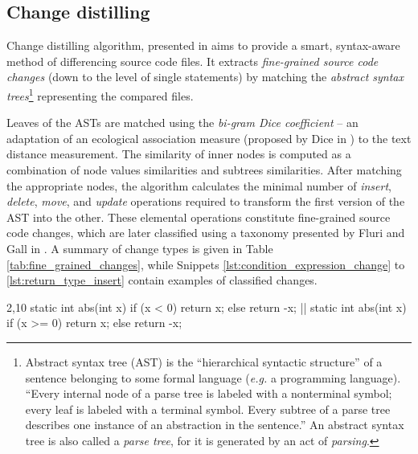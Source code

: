 \documentclass{pracamgr}
\newenvironment{diff}[2]
	{
		\hspace*{-\parindent}
		\begin{minipage}{\textwidth}
		\captionsetup{width=\linewidth}
		\captionof{lstlisting}{#1}
		\label{#2}
	}
	{
		\end{minipage}
	}
\begin{document}
\subsection{Change distilling}
\label{sec:change_distilling}
Change distilling algorithm, presented in \cite{change_distilling} aims to provide a smart, syntax-aware method of differencing source code files. It extracts \emph{fine-grained source code changes} (down to the level of single statements) by matching the \emph{abstract syntax trees}\footnote{Abstract syntax tree (AST) is the ``hierarchical syntactic structure'' of a sentence belonging to some formal language (\textit{e.g.} a programming language). ``Every internal node of a parse tree is labeled with a nonterminal symbol; every leaf is labeled with a terminal symbol. Every subtree of a parse tree describes one instance of an abstraction in the sentence.'' \cite[p. 121]{concepts} An abstract syntax tree is also called a \emph{parse tree}, for it is generated by an act of \emph{parsing}.} representing the compared files.

Leaves of the ASTs are matched using the \emph{bi-gram Dice coefficient} -- an adaptation of an ecological association measure (proposed by Dice in \cite{Dice}) to the text distance measurement. The similarity of inner nodes is computed as a combination of node values similarities and subtrees similarities. After matching the appropriate nodes, the algorithm calculates the minimal number of \emph{insert}, \emph{delete}, \emph{move}, and \emph{update} operations required to transform the first version of the AST into the other. These elemental operations constitute fine-grained source code changes, which are later classified using a taxonomy presented by Fluri and Gall in \cite{classifying}. A summary of change types is given in Table \ref{tab:fine_grained_changes}, while Snippets \ref{lst:condition_expression_change} to \ref{lst:return_type_insert} contain examples of classified changes.

\addtocounter{footnote}{1}
\addtocounter{footnote}{-1}


\begin{diff}{Condition expression change}{lst:condition_expression_change}
\begin{lstdiff}{2,10}
static int abs(int x) {
	if (x < 0) {
		return x;
	} else {
		return -x;
	}
}
|\vfill\columnbreak|
static int abs(int x) {
	if (x >= 0) {
		return x;
	} else {
		return -x;
	}
}
\end{lstdiff}
\end{diff}
\end{document}
